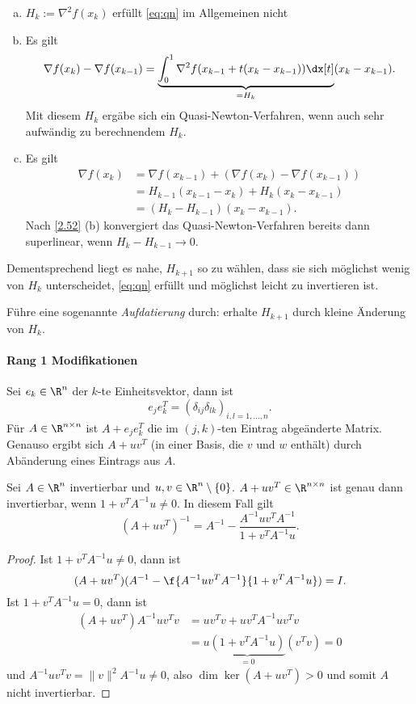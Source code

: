 \begin{nt} \label{2.54}
	\begin{enumerate}[(a)]
		\item
			$H_k := \nabla^2 f(x_k)$ erfüllt \eqref{eq:qn} im Allgemeinen nicht
		\item
			Es gilt
			\[
				\nabla f(x_k) - \nabla f(x_{k-1})
				= \underbrace{\int_0^1 \nabla^2 f(x_{k-1} + t (x_k - x_{k-1})) \dx[t]}_{= H_k} (x_k - x_{k-1}).
			\]
			Mit diesem $H_k$ ergäbe sich ein Quasi-Newton-Verfahren, wenn auch sehr aufwändig zu berechnendem $H_k$.
		\item
			Es gilt
			\begin{align*}
				\nabla f(x_k)
				&= \nabla f(x_{k-1}) + ( \nabla f(x_k) - \nabla f(x_{k-1}) ) \\
				&= H_{k-1} (x_{k-1} - x_k) + H_k (x_k - x_{k-1}) \\
				&= (H_k - H_{k-1})(x_k - x_{k-1}).
			\end{align*}
			Nach \ref{2.52} (b) konvergiert das Quasi-Newton-Verfahren bereits dann superlinear, wenn $H_k - H_{k-1} \to 0$.
	\end{enumerate}
\end{nt}

Dementsprechend liegt es nahe, $H_{k+1}$ so zu wählen, dass sie sich möglichst wenig von $H_k$ unterscheidet, \eqref{eq:qn} erfüllt und möglichst leicht zu invertieren ist.

Führe eine sogenannte \emph{Aufdatierung} durch: erhalte $H_{k+1}$ durch kleine Änderung von $H_k$.

\paragraph{Rang 1 Modifikationen}

Sei $e_k \in \R^n$ der $k$-te Einheitsvektor, dann ist
\[
	e_j e_k^T = (\delta_{ij}\delta_{lk})_{i,l = 1, \dotsc, n}.
\]
Für $A \in \R^{n\times n}$ ist $A + e_j e_k^T$ die im $(j,k)$-ten Eintrag abgeänderte Matrix.
Genauso ergibt sich $A + uv^T$ (in einer Basis, die $v$ und $w$ enthält) durch Abänderung eines Eintrags aus $A$.

\begin{lem} \label{2.55}
	Sei $A \in \R^n$ invertierbar und $u, v \in \R^n \setminus \{0\}$.
	$A + uv^T \in \R^{n\times n}$ ist genau dann invertierbar, wenn $1 + v^T A^{-1} u \neq 0$.
	In diesem Fall gilt
	\[
		(A + uv^T)^{-1} = A^{-1} - \dfrac {A^{-1} u v^T A^{-1}}{1 + v^T A^{-1} u}.
	\]
	\begin{proof}
		Ist $1 + v^T A^{-1} u \neq 0$, dann ist
		\[
			(A + uv^T)(A^{-1} - \f {A^{-1} uv^T A^{-1}}{1 + v^T A^{-1} u} ) = I.
		\]
		Ist $1 + v^T A^{-1} u = 0$, dann ist
		\begin{align*}
			(A + uv^T) A^{-1} uv^Tv
			&= uv^Tv + uv^TA^{-1} uv^Tv \\
			&= u \underbrace{(1 + v^TA^{-1}u)}_{=0} (v^Tv)
			= 0
		\end{align*}
		und $A^{-1} uv^Tv = \|v\|^2 A^{-1} u \neq 0$, also $\dim \ker (A + uv^T) > 0$ und somit $A$ nicht invertierbar.
	\end{proof}
\end{lem}

